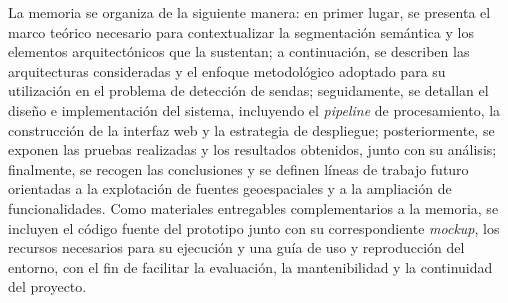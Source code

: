 La memoria se organiza de la siguiente manera: en primer lugar, se presenta el marco teórico necesario para contextualizar la segmentación semántica y los elementos arquitectónicos que la sustentan; a continuación, se describen las arquitecturas consideradas y el enfoque metodológico adoptado para su utilización en el problema de detección de sendas; seguidamente, se detallan el diseño e implementación del sistema, incluyendo el \textit{pipeline} de procesamiento, la construcción de la interfaz web y la estrategia de despliegue; posteriormente, se exponen las pruebas realizadas y los resultados obtenidos, junto con su análisis; finalmente, se recogen las conclusiones y se definen líneas de trabajo futuro orientadas a la explotación de fuentes geoespaciales y a la ampliación de funcionalidades. Como materiales entregables complementarios a la memoria, se incluyen el código fuente del prototipo junto con su correspondiente \textit{mockup}, los recursos necesarios para su ejecución y una guía de uso y reproducción del entorno, con el fin de facilitar la evaluación, la mantenibilidad y la continuidad del proyecto.

